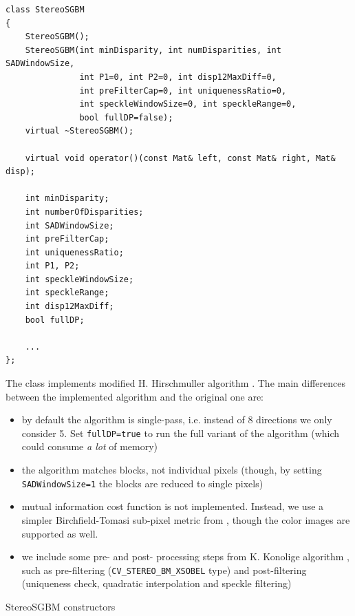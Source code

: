\begin{lstlisting}
class StereoSGBM
{
    StereoSGBM();
    StereoSGBM(int minDisparity, int numDisparities, int SADWindowSize,
               int P1=0, int P2=0, int disp12MaxDiff=0,
               int preFilterCap=0, int uniquenessRatio=0,
               int speckleWindowSize=0, int speckleRange=0,
               bool fullDP=false);
    virtual ~StereoSGBM();

    virtual void operator()(const Mat& left, const Mat& right, Mat& disp);

    int minDisparity;
    int numberOfDisparities;
    int SADWindowSize;
    int preFilterCap;
    int uniquenessRatio;
    int P1, P2;
    int speckleWindowSize;
    int speckleRange;
    int disp12MaxDiff;
    bool fullDP;

    ...
};
\end{lstlisting}

The class implements modified H. Hirschmuller algorithm \cite{HH08}. The main differences between the implemented algorithm and the original one are:

\begin{itemize}
    \item by default the algorithm is single-pass, i.e. instead of 8 directions we only consider 5. Set \texttt{fullDP=true} to run the full variant of the algorithm (which could consume \emph{a lot} of memory)
    \item the algorithm matches blocks, not individual pixels (though, by setting \texttt{SADWindowSize=1} the blocks are reduced to single pixels)
    \item mutual information cost function is not implemented. Instead, we use a simpler Birchfield-Tomasi sub-pixel metric from \cite{BT96}, though the color images are supported as well.
    \item we include some pre- and post- processing steps from K. Konolige algorithm , such as pre-filtering (\texttt{CV\_STEREO\_BM\_XSOBEL} type) and post-filtering (uniqueness check, quadratic interpolation and speckle filtering)
\end{itemize}

StereoSGBM constructors

